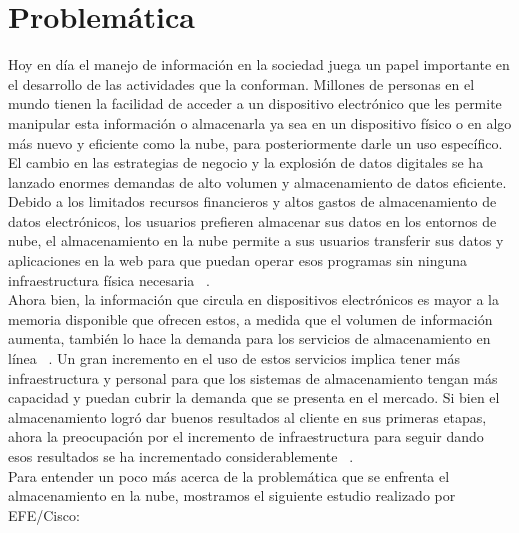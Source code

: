 \section{Problemática}
Hoy en día el manejo de información en la sociedad juega un papel importante en el desarrollo de las actividades que la conforman. Millones de personas en el mundo tienen la facilidad de acceder a un dispositivo electrónico que les permite manipular esta información o almacenarla ya sea en un dispositivo físico o en algo más nuevo y eficiente como la nube, para posteriormente darle un uso específico.
El cambio en las estrategias de negocio y la explosión de datos digitales se ha lanzado enormes demandas de alto volumen y almacenamiento de datos eficiente. Debido a los limitados recursos financieros y altos gastos de almacenamiento de datos electrónicos, los usuarios prefieren almacenar sus datos en los entornos de nube, el almacenamiento en la nube permite a sus usuarios transferir sus datos y aplicaciones en la web para que puedan operar esos programas sin ninguna infraestructura física necesaria ~\cite{Keelveedhi}.
\\

Ahora bien, la información que circula en dispositivos electrónicos es mayor a la memoria disponible que ofrecen estos, a medida que el volumen de información aumenta, también lo hace la demanda para los servicios de almacenamiento en línea ~\cite{Bellare}. Un gran incremento en el uso de estos servicios implica tener más infraestructura y personal para que los sistemas de almacenamiento tengan más capacidad y puedan cubrir la demanda que se presenta en el mercado. Si bien el almacenamiento logró dar buenos resultados al cliente en sus primeras etapas, ahora la preocupación por el incremento de infraestructura para seguir dando esos resultados se ha incrementado considerablemente  ~\cite{Keelveedhi}.
\\ 

Para entender un poco más acerca de la problemática que se enfrenta el almacenamiento en la nube, mostramos el siguiente estudio realizado por EFE/Cisco:\\ 

